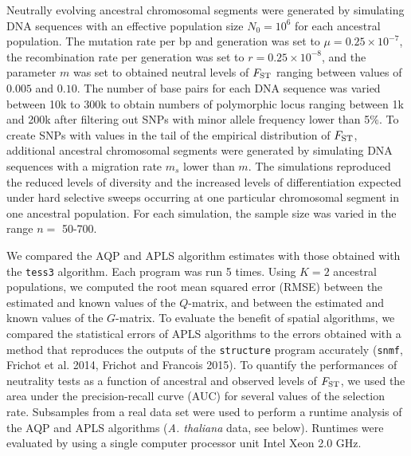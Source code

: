 Neutrally evolving ancestral chromosomal segments were generated by simulating DNA sequences with an effective  population size $N_0 = 10^6$ for each ancestral population. The mutation rate per bp and generation was set to $\mu = 0.25 \times 10^{-7}$, the recombination rate per generation was set to $r = 0.25 \times 10^{-8}$, and the parameter $m$ was set to obtained neutral levels of $F_{\rm ST}$ ranging between values of $0.005$ and $0.10$. The number of base pairs for each DNA sequence was varied between 10k to 300k to obtain numbers of polymorphic locus ranging between 1k and 200k after filtering out SNPs with minor allele frequency lower than 5$\%$.  To create SNPs with values in the tail of the empirical distribution of $F_{\rm ST}$,  additional ancestral chromosomal segments were generated by simulating DNA sequences with a migration rate $m_s$ lower than $m$. The simulations reproduced the reduced levels of diversity and the increased levels of differentiation expected under hard selective sweeps occurring at one particular chromosomal segment in one ancestral population.  For each simulation, the sample size  was varied in the range $n =$ 50-700.

 We compared the AQP and APLS algorithm estimates with those obtained with the {\tt tess3} algorithm.  Each program was run 5 times.  Using $K = 2$ ancestral populations, we computed the root mean squared error (RMSE) between the estimated and known values of the $Q$-matrix, and between  the estimated and known values of the $G$-matrix. 
To evaluate the benefit of spatial algorithms, we compared the statistical errors of APLS algorithms to the errors obtained with a method that reproduces the outputs of the {\tt structure} program accurately ({\tt snmf}, Frichot et al. 2014, Frichot and Francois 2015).  To quantify the performances of neutrality tests as a function of ancestral and observed levels of $F_{\rm ST}$, we used the area under the precision-recall curve (AUC) for several values of the selection rate.  Subsamples from a real data set were used to perform a runtime analysis of the AQP and APLS algorithms ({\it A. thaliana} data, see below). Runtimes were evaluated by using a single computer processor unit Intel Xeon 2.0 GHz.

